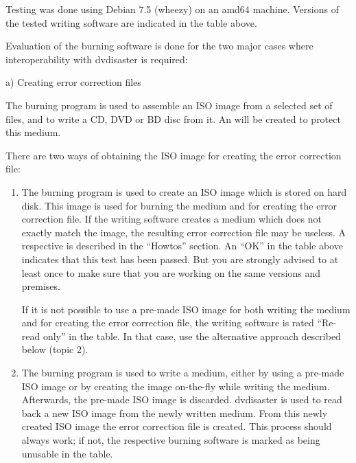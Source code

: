 Testing was done using Debian 7.5 (wheezy) on an amd64 machine.
Versions of the tested writing software are indicated in the table above.

\medskip

Evaluation of the burning software is done for the two major cases where
interoperability with dvdisaster is required: 

\bigskip

a) Creating error correction files

\medskip

The burning program is used to assemble an ISO image from a selected set of files,
and to write a CD, DVD or BD disc from it. An  will
be created to protect this medium.

\smallskip

There are two ways of obtaining the ISO image for creating the error correction file:

\begin{enumerate}
\item The burning program is used to create an ISO image which is stored on hard disk.
  This image is used for burning the medium and for creating the error correction file.
  If the writing software creates a medium which does not exactly match the image,
  the resulting error correction file may be useless.
  A respective  is described
  in the ``Howtos'' section. An ``OK'' in the table above indicates that
  this test has been passed. But you are strongly advised to
   at least
  once to make sure that you are working on the same versions and premises.

  \smallskip
  
  If it is not possible to use a pre-made ISO image for both writing the medium
  and for creating the error correction file, the writing software is
  rated ``Re-read only'' in the table. In that case, use the alternative
  approach described below (topic 2).

\item The burning program is used to write a medium, either by using a
  pre-made ISO image or by creating the image on-the-fly while writing
  the medium. Afterwards, the pre-made ISO image is discarded. dvdisaster
  is used to read back a new ISO image from the newly written medium. From
  this newly created ISO image the error correction file is created. This
  process should always work; if not, the respective burning software is
  marked as being unusable in the table.
\end{enumerate}
  
